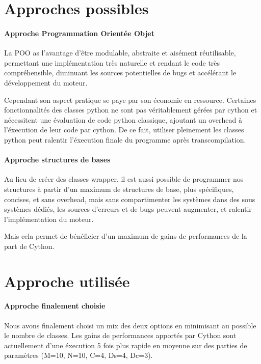 		
		
	\section{Approches possibles}
		
		
		
		\paragraph{Approche Programmation Orientée Objet}
		La POO as l'avantage d'être modulable, abstraite et aisément réutilisable, permettant une implémentation très naturelle et rendant le code très compréhensible, diminuant les sources potentielles de bugs et accélérant le développement du moteur.  
		
		Cependant son aspect pratique se paye par son économie en ressource. 
		Certaines fonctionnalités des classes python ne sont pas véritablement gérées par cython et nécessitent une évaluation de code python classique, ajoutant un overhead à l'éxecution de leur code par cython.
		De ce fait, utiliser pleinement les classes python peut ralentir l'éxecution finale du programme après transcompilation.
		
		\paragraph{Approche structures de bases}
		Au lieu de créer des classes wrapper, il est aussi possible de programmer nos structures à partir d'un maximum de structures de base, plus spécifiques, concises, et sans overhead, mais sans compartimenter les systèmes dans des sous systèmes dédiés, les sources d'erreurs et de bugs peuvent augmenter, et ralentir l'implémentation du moteur.
		
		Mais cela permet de bénéficier d'un maximum de gains de performances de la part de Cython.
	
	\section{Approche utilisée}
		
		\paragraph{Approche finalement choisie}
		Nous avons finalement choisi un mix des deux options en minimisant au possible le nombre de classes. 
		Les gains de performances apportés par Cython sont actuellement d'une éxecution 5 fois plus rapide en moyenne sur des parties de paramètres (M=10, N=10, C=4, Ds=4, Dc=3).
		
